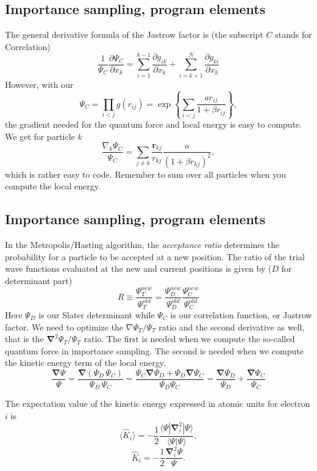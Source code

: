 \documentclass[graybox,sectrefs,envcountresetchap,open=right]{svmonodo}
\begin{document}
\subsection{Importance sampling, program elements}

The general derivative formula of the Jastrow factor is (the subscript $C$ stands for Correlation)
\[
\frac{1}{\Psi_C}\frac{\partial \Psi_C}{\partial x_k} =
\sum_{i=1}^{k-1}\frac{\partial g_{ik}}{\partial x_k}
+
\sum_{i=k+1}^{N}\frac{\partial g_{ki}}{\partial x_k}
\]
However, 
with our
\[
\Psi_C=\prod_{i< j}g(r_{ij})= \exp{\left\{\sum_{i<j}\frac{ar_{ij}}{1+\beta r_{ij}}\right\}},
\]
the gradient needed for the quantum force and local energy is easy to compute.  
We get for particle  $k$
\[
\frac{ \nabla_k \Psi_C}{ \Psi_C }= \sum_{j\ne k}\frac{\mathbf{r}_{kj}}{r_{kj}}\frac{a}{(1+\beta r_{kj})^2},
\]
which is rather easy to code.  Remember to sum over all particles  when you compute the local energy.





\subsection{Importance sampling, program elements}

In the Metropolis/Hasting algorithm, the \emph{acceptance ratio} determines the probability for a particle  to be accepted at a new position. The ratio of the trial wave functions evaluated at the new and current positions is given by ($D$ for determinant part)
\[
R \equiv \frac{\Psi_{T}^{new}}{\Psi_{T}^{old}} = 
\frac{\Psi_{D}^{new}}{\Psi_{D}^{old}}\frac{\Psi_{C}^{new}}{\Psi_{C}^{old}}
\]
Here $\Psi_{D}$ is our Slater determinant while $\Psi_{C}$ is our correlation function, or Jastrow factor. 
We need to optimize the $\nabla \Psi_T / \Psi_T$ ratio and the second derivative as well, that is
the $\mathbf{\nabla}^2 \Psi_T/\Psi_T$ ratio. The first is needed when we compute the so-called quantum force in importance sampling.
The second is needed when we compute the kinetic energy term of the local energy.
\[
\frac{\mathbf{\mathbf{\nabla}}  \Psi}{\Psi}  = \frac{\mathbf{\nabla}  (\Psi_{D} \, \Psi_{C})}{\Psi_{D} \, \Psi_{C}}  =  \frac{ \Psi_C \mathbf{\nabla}  \Psi_{D} + \Psi_{D} \mathbf{\nabla}  \Psi_{C}}{\Psi_{D} \Psi_{C}} = \frac{\mathbf{\nabla}  \Psi_{D}}{\Psi_{D}} + \frac{\mathbf{\nabla}   \Psi_C}{ \Psi_C}
\]





The expectation value of the kinetic energy expressed in atomic units for electron $i$ is 
\[
 \langle \hat{K}_i \rangle = -\frac{1}{2}\frac{\langle\Psi|\mathbf{\nabla}_{i}^2|\Psi \rangle}{\langle\Psi|\Psi \rangle},
\]
\[
\hat{K}_i = -\frac{1}{2}\frac{\mathbf{\nabla}_{i}^{2} \Psi}{\Psi}.
\]
\end{document}
